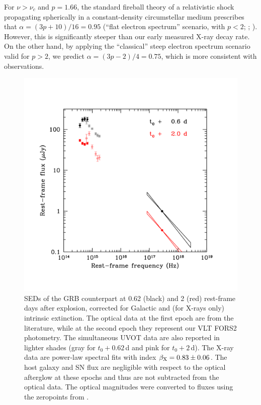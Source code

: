 \documentclass[fleqn,usenatbib]{mnras}
\begin{document}
For $\nu > \nu_c$ and $p = 1.66$,  the standard fireball theory  of a relativistic shock propagating spherically in a constant-density circumstellar medium prescribes  that $\alpha = (3p + 10)/16 = 0.95$ 
 (``flat electron spectrum'' scenario, with $p < 2$; \citealt{Dai01}; \citealt{Zhang04}). 
However, this is  significantly steeper than our early measured X-ray decay rate.  On the other
hand, by applying  the ``classical'' steep electron  spectrum  scenario valid for $p > 2$, 
we predict $\alpha = (3p - 2)/4 = 0.75$, which is more consistent with observations.  

\begin{figure}
\centering
\includegraphics[scale=0.4]{plots/figure_mwlsed.pdf}
\caption{SEDs of the GRB counterpart at 0.62 (black) and 2 (red) rest-frame days after explosion, corrected for Galactic and (for X-rays only) intrinsic extinction.  The optical data at the first epoch are from the literature, while at the second epoch they represent our VLT FORS2 photometry.   The simultaneous UVOT data are also reported in lighter shades (gray for $t_0 + 0.62$\,d and pink for $t_0 + 2$\,d).  The X-ray data are power-law spectral fits with index $\beta_{\rm X} = 0.83 \pm 0.06$. The host galaxy and SN flux are negligible with respect to the optical afterglow at these epochs and thus are not subtracted from the optical data. The optical magnitudes were converted to fluxes using the zeropoints from \citep{Fukugita95}.}
\label{fig:SED}
\end{figure}
\end{document}
